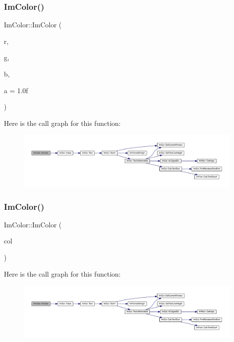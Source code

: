 \subsubsection{\texorpdfstring{Im\+Color()}{ImColor()}\hspace{0.1cm}{\footnotesize\ttfamily [4/5]}}
{\footnotesize\ttfamily Im\+Color\+::\+Im\+Color (\begin{DoxyParamCaption}\item[{float}]{r,  }\item[{float}]{g,  }\item[{float}]{b,  }\item[{float}]{a = {\ttfamily 1.0f} }\end{DoxyParamCaption})\hspace{0.3cm}{\ttfamily [inline]}}

Here is the call graph for this function\+:
\nopagebreak
\begin{figure}[H]
\begin{center}
\leavevmode
\includegraphics[width=350pt]{struct_im_color_a92b53917ca9d90a7207b18270ff5453d_cgraph}
\end{center}
\end{figure}
\mbox{\label{struct_im_color_aa5306926b3ef766a8647b26bdfd9f8d2}} 
\subsubsection{\texorpdfstring{Im\+Color()}{ImColor()}\hspace{0.1cm}{\footnotesize\ttfamily [5/5]}}
{\footnotesize\ttfamily Im\+Color\+::\+Im\+Color (\begin{DoxyParamCaption}\item[{const \mbox{\hyperlink{struct_im_vec4}{Im\+Vec4}} \&}]{col }\end{DoxyParamCaption})\hspace{0.3cm}{\ttfamily [inline]}}

Here is the call graph for this function\+:
\nopagebreak
\begin{figure}[H]
\begin{center}
\leavevmode
\includegraphics[width=350pt]{struct_im_color_aa5306926b3ef766a8647b26bdfd9f8d2_cgraph}
\end{center}
\end{figure}


